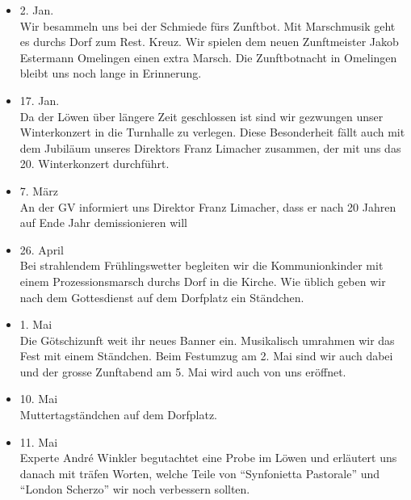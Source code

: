 \begin{multicols}{2}


    \begin{itemize}

        \item[]2. Jan.\\
        Wir besammeln uns bei der Schmiede fürs Zunftbot. Mit Marschmusik geht
        es durchs Dorf zum Rest. Kreuz. Wir spielen dem neuen Zunftmeister Jakob
        Estermann Omelingen einen extra Marsch. Die Zunftbotnacht in Omelingen
        bleibt uns noch lange in Erinnerung.

        \item[]17. Jan.\\
        Da der Löwen über längere Zeit geschlossen ist sind wir gezwungen unser
        Winterkonzert in die Turnhalle zu verlegen. Diese Besonderheit fällt
        auch mit dem Jubiläum unseres Direktors Franz Limacher zusammen, der mit
        uns das 20. Winterkonzert durchführt.

        \item[]7. März\\
        An der GV informiert uns Direktor Franz Limacher, dass er nach 20 Jahren
        auf Ende Jahr demissionieren will

        \item[]26. April\\
        Bei strahlendem Frühlingswetter begleiten wir die Kommunionkinder mit
        einem Prozessionsmarsch durchs Dorf in die Kirche. Wie üblich geben wir
        nach dem Gottesdienst auf dem Dorfplatz ein Ständchen.

        \item[]1. Mai\\
        Die Götschizunft weit ihr neues Banner ein. Musikalisch umrahmen wir das
        Fest mit einem Ständchen. Beim Festumzug am 2. Mai sind wir auch dabei
        und der grosse Zunftabend am 5. Mai wird auch von uns eröffnet.

        \item[]10. Mai\\
        Muttertagständchen auf dem Dorfplatz.

        \item[]11. Mai\\
        Experte André Winkler begutachtet eine Probe im Löwen und erläutert uns
        danach mit träfen Worten, welche Teile von \enquote{Synfonietta Pastorale} und
        \enquote{London Scherzo} wir noch verbessern sollten.


\end{itemize}
\end{multicols}
